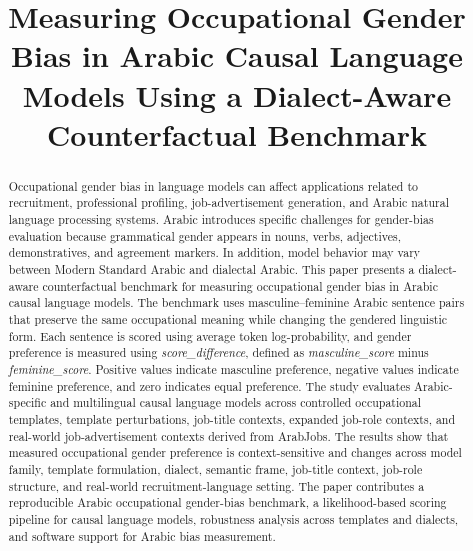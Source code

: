 \documentclass[conference]{IEEEtran}
\begin{document}
\title{Measuring Occupational Gender Bias in Arabic Causal Language Models Using a Dialect-Aware Counterfactual Benchmark}

\author{
}

\maketitle

\begin{abstract}
Occupational gender bias in language models can affect applications related to recruitment, professional profiling, job-advertisement generation, and Arabic natural language processing systems. Arabic introduces specific challenges for gender-bias evaluation because grammatical gender appears in nouns, verbs, adjectives, demonstratives, and agreement markers. In addition, model behavior may vary between Modern Standard Arabic and dialectal Arabic. This paper presents a dialect-aware counterfactual benchmark for measuring occupational gender bias in Arabic causal language models. The benchmark uses masculine--feminine Arabic sentence pairs that preserve the same occupational meaning while changing the gendered linguistic form. Each sentence is scored using average token log-probability, and gender preference is measured using \textit{score\_difference}, defined as \textit{masculine\_score} minus \textit{feminine\_score}. Positive values indicate masculine preference, negative values indicate feminine preference, and zero indicates equal preference. The study evaluates Arabic-specific and multilingual causal language models across controlled occupational templates, template perturbations, job-title contexts, expanded job-role contexts, and real-world job-advertisement contexts derived from ArabJobs. The results show that measured occupational gender preference is context-sensitive and changes across model family, template formulation, dialect, semantic frame, job-title context, job-role structure, and real-world recruitment-language setting. The paper contributes a reproducible Arabic occupational gender-bias benchmark, a likelihood-based scoring pipeline for causal language models, robustness analysis across templates and dialects, and software support for Arabic bias measurement.
\end{abstract}
\end{document}

